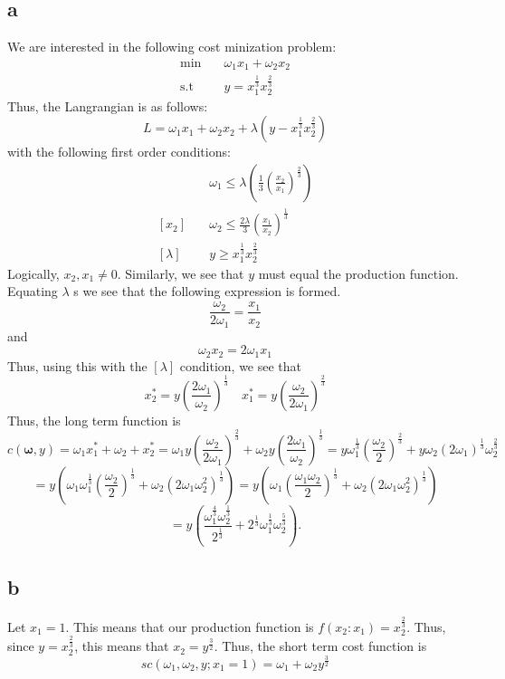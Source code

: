 \documentclass[11pt]{article}
\newcommand{\st}{\text{s.t}}
\begin{document}
\subsection*{a}
We are interested in the following cost minization problem:
\begin{align*}
    \min & \quad \omega_1 x_1 + \omega_2 x_2\\
    \st & \quad y = x_1^{\frac{1}{3}} x_2^{\frac{2}{3}}
\end{align*}
Thus, the Langrangian is as follows:
\[
L = \omega_1x_1 + \omega_2x_2 +\lambda(y -  x_1^{\frac{1}{3}} x_2^{\frac{2}{3}})
\]
with the following first order conditions:
\begin{align*}
    [x_1] & \quad \omega_1 \leq \lambda \left( \frac{1}{3} \left( \frac{x_2}{x_1} \right)^\frac{2}{3} \right)\\
    [x_2] & \quad \omega_2 \leq \frac{2\lambda}{3} \left( \frac{x_1}{x_2} \right)^\frac{1}{3}\\
    [\lambda] & \quad y \geq x_1^\frac{1}{3} x_2^\frac{2}{3}
\end{align*}
Logically, $x_2, x_1 \neq 0$. Similarly, we see that $y$ must equal the production function. Equating $\lambda$ s we see that the following expression is formed. 
\[
\frac{\omega_2}{2 \omega_1} = \frac{x_1}{x_2}
\]
and 
\[
\omega_2 x_2 = 2\omega_1 x_1
\]
Thus, using this with the $[\lambda]$ condition, we see that 
\[
x_2^* = y \left( \frac{2\omega_1}{\omega_2} \right)^\frac{1}{3} \quad x_1^* = y \left( \frac{\omega_2}{2\omega_1} \right)^\frac{2}{3}
\]
Thus, the long term function is
\[
c(\mathbf{\omega}, y) = \omega_1 x_1^* + \omega_2 + x_2^* = \omega_1 y \left( \frac{\omega_2}{2\omega_1} \right)^\frac{2}{3} + \omega_2  y \left( \frac{2\omega_1}{\omega_2} \right)^\frac{1}{3} = y \omega_1^\frac{1}{3} \left( \frac{\omega_2}{2} \right)^\frac{2}{3} + y \omega_2 (2\omega_1)^\frac{1}{3}\omega_2^\frac{2}{3}
\]
\[
= y \left( \omega_1 \omega_1^\frac{1}{3} \left( \frac{\omega_2}{2} \right)^\frac{1}{3} + \omega_2 (2\omega_1 \omega_2^2)^\frac{1}{3} \right) = y \left( \omega_1 \left( \frac{\omega_1 \omega_2}{2}  \right)^\frac{1}{3} + \omega_2 (2\omega_1 \omega_2^2)^\frac{1}{3} \right)
\]
\[
 = y \left( \frac{\omega_1^{\frac{4}{3}} \omega_2^{\frac{1}{3}}}{2^{\frac{1}{3}}} + 2^{\frac{1}{3}} \omega_1^{\frac{1}{3}} \omega_2^{\frac{5}{3}} \right).
\]

\subsection*{b}
Let $x_1 = 1$. This means that our production function is $f(x_2 : x_1) = x_2^\frac{2}{3}$. Thus, since $y = x_2^\frac{2}{3}$, this means that $x_2 = y^\frac{3}{2}$. Thus, the short term cost function is 
\[
sc(\omega_1, \omega_2, y; x_1 = 1) = \omega_1 + \omega_2 y^\frac{3}{2}
\]
\end{document}

